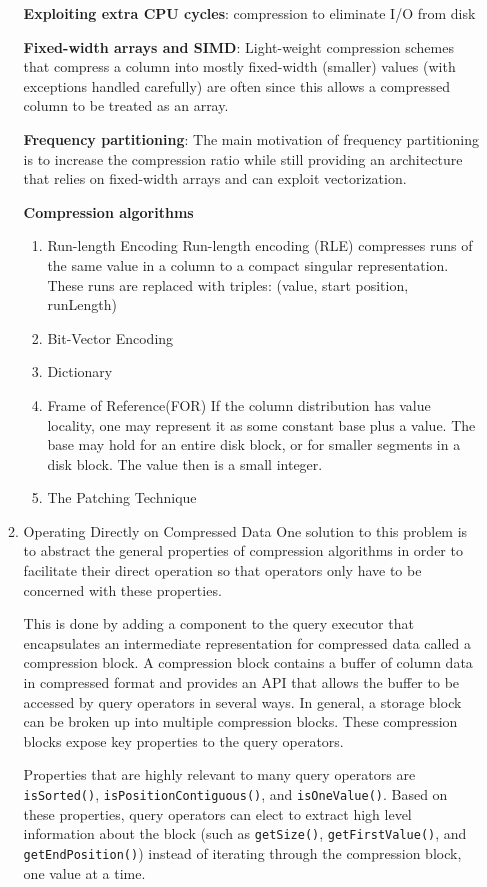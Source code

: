 \documentclass[11pt]{article}
\begin{document}
\begin{enumerate}
\begin{enumerate}
\textbf{Exploiting extra CPU cycles}: compression to eliminate I/O from disk

\textbf{Fixed-width arrays and SIMD}: Light-weight compression schemes that compress a column into mostly
fixed-width (smaller) values (with exceptions handled carefully) are often since this allows a
compressed column to be treated as an array.

\textbf{Frequency partitioning}: The main motivation of frequency partitioning is to increase the compression
ratio while still providing an architecture that relies on fixed-width arrays and can exploit
vectorization.

\textbf{Compression algorithms}
\begin{enumerate}
\item Run-length Encoding
\label{sec:org6551419}
Run-length encoding (RLE) compresses runs of the same value in a column to a compact singular
representation. These runs are replaced with triples: (value, start position, runLength)
\item Bit-Vector Encoding
\label{sec:orgc4d73a9}
\item Dictionary
\label{sec:org3ce18a3}
\item Frame of Reference(FOR)
\label{sec:org284900f}
If the column distribution has value locality, one may represent it as some constant base plus a
value. The base may hold for an entire disk block, or for smaller segments in a disk block. The value
then is a small integer.
\item The Patching Technique
\label{sec:orgcfab0df}
\end{enumerate}
\item Operating Directly on Compressed Data
\label{sec:orgc9be93b}
One solution to this problem is to abstract the general properties of compression algorithms in order
to facilitate their direct operation so that operators only have to be concerned with these
properties.

This is done by adding a component to the query executor that encapsulates an intermediate
representation for compressed data called a compression block. A compression block contains a buffer
of column data in compressed format and provides an API that allows the buffer to be accessed by query
operators in several ways. In general, a storage block can be broken up into multiple compression
blocks. These compression blocks expose key properties to the query operators.

Properties that are highly relevant to many query operators are \texttt{isSorted()}, \texttt{isPositionContiguous()},
and \texttt{isOneValue()}. Based on these properties, query operators can elect to extract high level
information about the block (such as \texttt{getSize()}, \texttt{getFirstValue()}, and \texttt{getEndPosition()}) instead of
iterating through the compression block, one value at a time.


\end{enumerate}
\end{enumerate}
\end{document}
